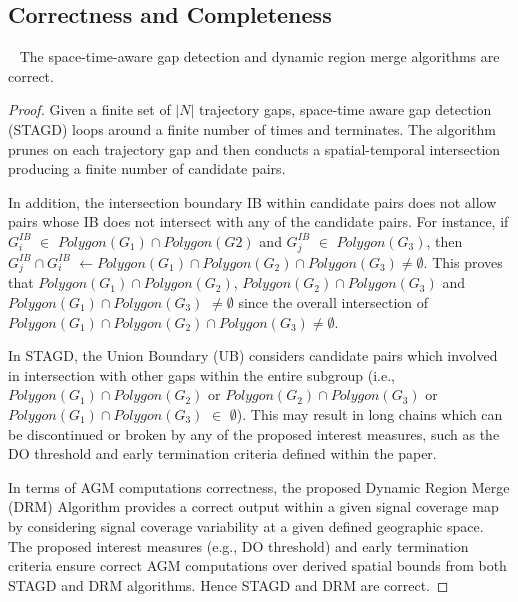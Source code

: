\documentclass[acmsmall]{acmart}
\begin{document}
\subsection{Correctness and Completeness}
\label{subsection:correct_complete}
\begin{lemma}~\label{lemma:Memo-AGM_correct} 
The space-time-aware gap detection and dynamic region merge algorithms are correct.
\end{lemma}
\begin{proof}
Given a finite set of $|N|$ trajectory gaps, space-time aware gap detection (STAGD) loops around a finite number of times and terminates. The algorithm prunes on each trajectory gap and then conducts a spatial-temporal intersection producing a finite number of candidate pairs. 

In addition, the intersection boundary IB within candidate pairs does not allow pairs whose IB does not intersect with any of the candidate pairs. For instance, if $G_{i}^{IB}$ $\in$ $Polygon(G_{1}) \cap Polygon(G{2})$ and $G_{j}^{IB}$ $\in$ $Polygon(G_{3})$, then $G_{j}^{IB} \cap G_{i}^{IB}$ $\gets Polygon(G_{1}) \cap Polygon(G_{2}) \cap Polygon(G_{3}) \neq \emptyset$. This proves that $Polygon(G_{1}) \cap Polygon(G_{2})$, $Polygon(G_{2}) \cap Polygon(G_{3})$ and $Polygon(G_{1}) \cap Polygon(G_{3})$ $\neq \emptyset$ since the overall intersection of $Polygon(G_{1}) \cap Polygon(G_{2}) \cap Polygon(G_{3}) \neq \emptyset$. 

In STAGD, the Union Boundary (UB) considers candidate pairs which involved in intersection with other gaps within the entire subgroup (i.e., $Polygon(G_{1}) \cap Polygon(G_{2})$ or $Polygon(G_{2}) \cap Polygon(G_{3})$ or $Polygon(G_{1}) \cap Polygon(G_{3})$ $\in$ $\emptyset$). This may result in long chains which can be discontinued or broken by any of the proposed interest measures, such as the DO threshold and early termination criteria defined within the paper. 

In terms of AGM computations correctness, the proposed Dynamic Region Merge (DRM) Algorithm provides a correct output within a given signal coverage map by considering signal coverage variability at a given defined geographic space. The proposed interest measures (e.g., DO threshold) and early termination criteria ensure correct AGM computations over derived spatial bounds from both STAGD and DRM algorithms. Hence STAGD and DRM are correct.
\end{proof}
\end{document}
